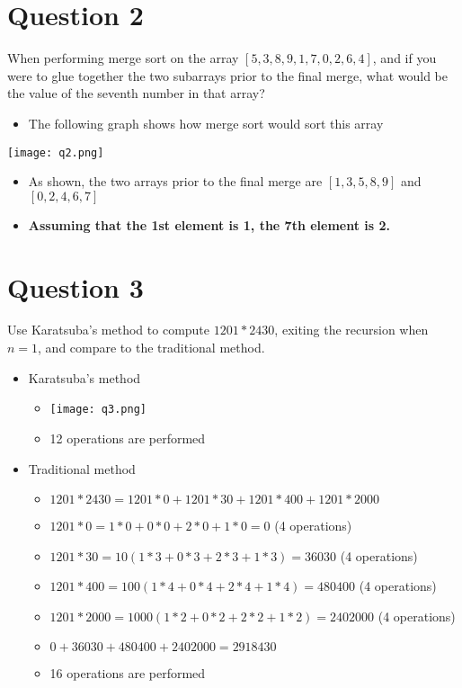 \documentclass{article}
\begin{document}
    \pagebreak
    \section{Question 2}
    When performing merge sort on the array $[5, 3, 8, 9, 1, 7, 0, 2, 6, 4]$, and if you were to glue together the two subarrays
    prior to the final merge, what would be the value of the seventh number in that array?
    	\begin{itemize}
    		\item The following graph shows how merge sort would sort this array
    	\end{itemize}
    	\begin{center}
    		\texttt{[image: q2.png]}
    	\end{center}
    	\begin{itemize}
    		\item As shown, the two arrays prior to the final merge are $[1, 3, 5, 8, 9]$ and $[0, 2, 4, 6, 7]$
    		\item \textbf{Assuming that the 1st element is 1, the 7th element is 2.} 
    	\end{itemize}
    
   \pagebreak
   \section{Question 3}
   Use Karatsuba's method to compute $1201 * 2430$, exiting the recursion when $n = 1$, and compare to the traditional method.
   	\begin{itemize}
   		\item Karatsuba's method
   			\begin{itemize}
   				\item 
   					\begin{center}
   						\texttt{[image: q3.png]}
   					\end{center}
   				\item 12 operations are performed
   			\end{itemize}
   		\item Traditional method
   			\begin{itemize}
   				\item $1201 * 2430 = 1201 * 0 + 1201 * 30 + 1201 * 400 + 1201 * 2000$
   				\item $1201 * 0 = 1*0 + 0*0 + 2*0 + 1*0 = 0$ (4 operations)
   				\item $1201 * 30 = 10(1*3 + 0*3 + 2*3 + 1*3) = 36030$ (4 operations)
   				\item $1201 * 400 = 100(1*4 + 0*4 + 2*4 + 1*4) = 480400$ (4 operations)
   				\item $1201 * 2000 = 1000(1*2 + 0*2 + 2*2 + 1*2) = 2402000$ (4 operations)
   				\item $0 + 36030 + 480400 + 2402000 = 2918430$
   				\item 16 operations are performed
   			\end{itemize}
  	\end{itemize}
  
\end{document}

